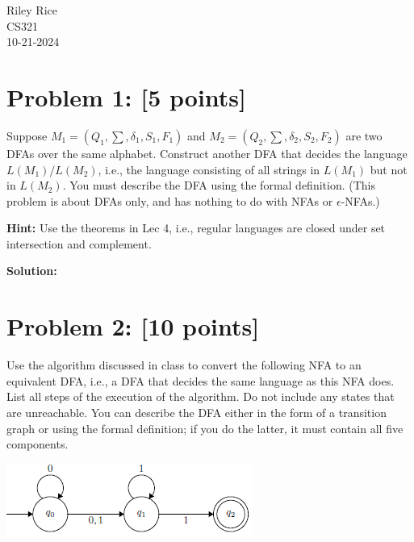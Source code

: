 \documentclass[11pt, letterpaper]{article}
\begin{document}
\noindent Riley Rice\\CS321\\10-21-2024

\begin{center}\end{center}

\section*{Problem 1: [5 points]}

Suppose $M_1 = (Q_1, \sum, \delta_1, S_1, F_1)$ and $M_2 = (Q_2, \sum, \delta_2, S_2, F_2)$ are two DFAs over the same alphabet. Construct another DFA that decides the language $L(M_1) / L(M_2)$, i.e., the language consisting of all strings in $L(M_1)$ but not in $L(M_2)$. You must describe the DFA using the formal definition. (This problem is about DFAs only, and has nothing to do with NFAs or $\epsilon$-NFAs.)

\vspace{5mm}

\noindent \textbf{Hint:} Use the theorems in Lec 4, i.e., regular languages are closed under set intersection and complement.

\vspace{5mm}

\noindent\textbf{Solution:}
 
 \vspace {5mm}

\newpage

\section*{Problem 2: [10 points]}

Use the algorithm discussed in class to convert the following NFA to an equivalent DFA, i.e., a DFA that decides the same language as this NFA does. List all steps of the execution of the algorithm. Do not include any states that are unreachable. You can describe the DFA either in the form of a transition graph or using the formal definition; if you do the latter, it must contain all five components.

\vspace{5mm}

\noindent\includegraphics[width=\textwidth]{Problem 2 DFA}
\end{document}
